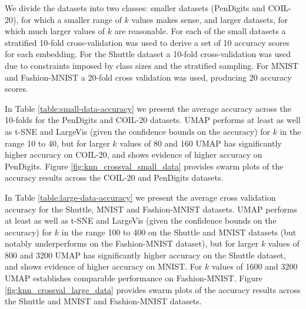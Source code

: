 \documentclass[12pt]{article}
\begin{document}
We divide the datasets into two classes: smaller datasets (PenDigits and COIL-20), for which a smaller range of $k$ values makes sense, and larger datasets, for which much larger values of $k$ are reasonable. For each of the small datasets a stratified 10-fold cross-validation was used to derive a set of 10 accuracy scores for each embedding. For the Shuttle dataset a 10-fold cross-validation was used due to constraints imposed by class sizes and the stratified sampling. For MNIST and Fashion-MNIST a 20-fold cross validation was used, producing 20 accuracy scores.

In Table \ref{table:small-data-accuracy} we present the average accuracy across the 10-folds for the PenDigits and COIL-20 datasets. UMAP performs at least as well as t-SNE and LargeVis (given the confidence bounds on the accuracy) for $k$ in the range 10 to 40, but for larger $k$ values of 80 and 160 UMAP has significantly higher accuracy on COIL-20, and shows evidence of higher accuracy on PenDigits. Figure \ref{fig:knn_crossval_small_data} provides swarm plots of the accuracy results across the COIL-20 and PenDigits datasets.

In Table \ref{table:large-data-accuracy} we present the average cross validation accuracy for the Shuttle, MNIST and Fashion-MNIST datasets. UMAP performs at least as well as t-SNE and LargeVis (given the confidence bounds on the accuracy) for $k$ in the range 100 to 400 on the Shuttle and MNIST datasets (but notably underperforms on the Fashion-MNIST dataset), but for larger $k$ values of 800 and 3200 UMAP has significantly higher accuracy on the Shuttle dataset, and shows evidence of higher accuracy on MNIST. For $k$ values of 1600 and 3200 UMAP establishes comparable performance on Fashion-MNIST. Figure \ref{fig:knn_crossval_large_data} provides swarm plots of the accuracy results across the Shuttle and MNIST and Fashion-MNIST datasets.
\end{document}
